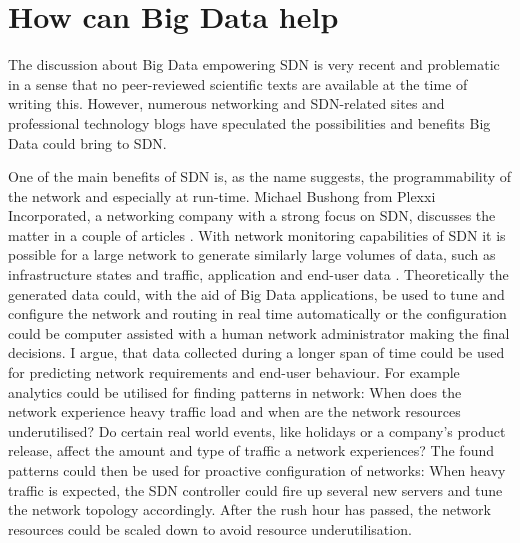 \documentclass{acm_proc_article-sp}
\begin{document}
\section{How can Big Data help}

The discussion about Big Data empowering SDN is very recent and problematic in a sense that no peer-reviewed scientific texts are available at the time of writing this. However, numerous networking and SDN-related sites and professional technology blogs have speculated the possibilities and benefits Big Data could bring to SDN.

One of the main benefits of SDN is, as the name suggests, the programmability of the network and especially at run-time. Michael Bushong from Plexxi Incorporated, a networking company with a strong focus on SDN, discusses the matter in a couple of articles \cite{Bushong2013, Bushong2013-2}. With network monitoring capabilities of SDN it is possible for a large network to generate similarly large volumes of data, such as infrastructure states and traffic, application and end-user data \cite{Bushong2013}. Theoretically the generated data could, with the aid of Big Data applications, be used to tune and configure the network and routing in real time automatically or the configuration could be computer assisted with a human network administrator making the final decisions. I argue, that data collected during a longer span of time could be used for predicting network requirements and end-user behaviour. For example analytics could be utilised for finding patterns in network: When does the network experience heavy traffic load and when are the network resources underutilised? Do certain real world events, like holidays or a company's product release, affect the amount and type of traffic a network experiences? The found patterns could then be used for proactive configuration of networks: When heavy traffic is expected, the SDN controller could fire up several new servers and tune the network topology accordingly. After the rush hour has passed, the network resources could be scaled down to avoid resource underutilisation.
\end{document}
